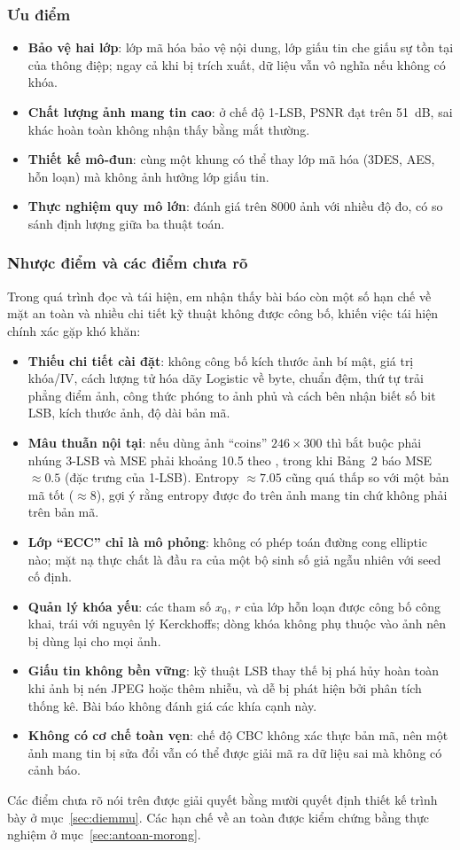 \subsubsection{Ưu điểm}

\begin{itemize}
  \item \textbf{Bảo vệ hai lớp}: lớp mã hóa bảo vệ nội dung, lớp giấu tin che giấu sự tồn tại của
        thông điệp; ngay cả khi bị trích xuất, dữ liệu vẫn vô nghĩa nếu không có khóa.
  \item \textbf{Chất lượng ảnh mang tin cao}: ở chế độ 1-LSB, PSNR đạt trên \SI{51}{dB}, sai khác
        hoàn toàn không nhận thấy bằng mắt thường.
  \item \textbf{Thiết kế mô-đun}: cùng một khung có thể thay lớp mã hóa (3DES, AES, hỗn loạn) mà
        không ảnh hưởng lớp giấu tin.
  \item \textbf{Thực nghiệm quy mô lớn}: đánh giá trên 8000 ảnh với nhiều độ đo, có so sánh định
        lượng giữa ba thuật toán.
\end{itemize}

\subsubsection{Nhược điểm và các điểm chưa rõ}

Trong quá trình đọc và tái hiện, em nhận thấy bài báo còn một số hạn chế về mặt an toàn và nhiều
chi tiết kỹ thuật không được công bố, khiến việc tái hiện chính xác gặp khó khăn:
\begin{itemize}
  \item \textbf{Thiếu chi tiết cài đặt}: không công bố kích thước ảnh bí mật, giá trị khóa/IV, cách
        lượng tử hóa dãy Logistic về byte, chuẩn đệm, thứ tự trải phẳng điểm ảnh, công thức phóng to
        ảnh phủ và cách bên nhận biết số bit LSB, kích thước ảnh, độ dài bản mã.
  \item \textbf{Mâu thuẫn nội tại}: nếu dùng ảnh ``coins'' $246\times300$ thì bắt buộc phải nhúng
        3-LSB và MSE phải khoảng 10.5 theo , trong khi Bảng~2 báo MSE $\approx 0.5$
        (đặc trưng của 1-LSB). Entropy $\approx 7.05$ cũng quá thấp so với một bản mã tốt
        ($\approx 8$), gợi ý rằng entropy được đo trên ảnh mang tin chứ không phải trên bản mã.
  \item \textbf{Lớp ``ECC'' chỉ là mô phỏng}: không có phép toán đường cong elliptic nào; mặt nạ thực
        chất là đầu ra của một bộ sinh số giả ngẫu nhiên với seed cố định.
  \item \textbf{Quản lý khóa yếu}: các tham số $x_0$, $r$ của lớp hỗn loạn được công bố công khai,
        trái với nguyên lý Kerckhoffs; dòng khóa không phụ thuộc vào ảnh nên bị dùng lại cho mọi ảnh.
  \item \textbf{Giấu tin không bền vững}: kỹ thuật LSB thay thế bị phá hủy hoàn toàn khi ảnh bị
        nén JPEG hoặc thêm nhiễu, và dễ bị phát hiện bởi phân tích thống kê. Bài báo không đánh giá
        các khía cạnh này.
  \item \textbf{Không có cơ chế toàn vẹn}: chế độ CBC không xác thực bản mã, nên một ảnh mang tin bị
        sửa đổi vẫn có thể được giải mã ra dữ liệu sai mà không có cảnh báo.
\end{itemize}

Các điểm chưa rõ nói trên được giải quyết bằng mười quyết định thiết kế trình bày ở
mục~\ref{sec:diemmu}. Các hạn chế về an toàn được kiểm chứng bằng thực nghiệm ở
mục~\ref{sec:antoan-morong}.
